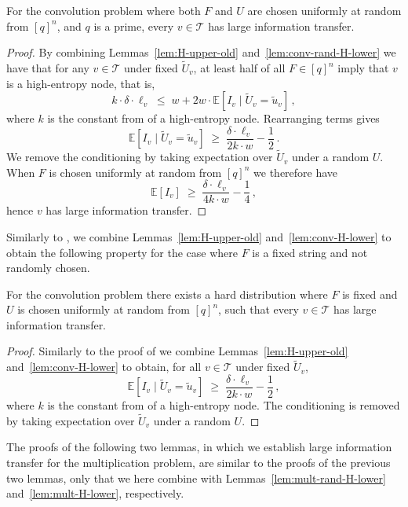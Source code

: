 \documentclass{toc}
\newcommand{\calT}{\ensuremath{\mathcal{T}}}
\newcommand{\expected}[1]{\ensuremath{\mathbb{E}[#1]}}
\newcommand{\lit}{large information transfer\xspace}
\newcommand{\Xvknown}{\ensuremath{\widetilde{U}_v}}
\newcommand{\Xvfix}{\ensuremath{\widetilde{u}_v}}
\newcommand{\vit}{\ensuremath{I_v}}
\begin{document}
\begin{lemma}
	\label{lem:conv-random-it}
	For the convolution problem where both $F$ and $U$ are chosen uniformly at random from $[q]^n$, and $q$ is a prime, every $v\in\calT$ has \lit.
\end{lemma}
\begin{proof}
	By combining Lemmas~\ref{lem:H-upper-old} and~\ref{lem:conv-rand-H-lower} we have that for any $v\in\calT$ under fixed $\Xvknown$, at least half of all $F\in [q]^n$ imply that $v$ is a high-entropy node, that is,
	\[
	k\cdot \delta \cdot\ell_v
	\;\leq\;
	w + 2w\cdot \expected{\vit \mid \Xvknown=\Xvfix}\,,
	\]
	where $k$ is the constant from  of a high-entropy node.
	Rearranging terms gives
	\[
	\expected{\vit \mid \Xvknown=\Xvfix}
	\;\geq\;
	\frac{\delta \cdot\ell_v}{2k\cdot w} - \frac12\,.
	\]
	We remove the conditioning by taking expectation over $\Xvknown$ under a random $U$.
	When $F$ is chosen uniformly at random from $[q]^n$ we therefore have
	\[
	\expected{\vit}
	\;\geq\;
	\frac{\delta \cdot\ell_v}{4k\cdot w} - \frac14\,,
	\]
	hence $v$ has \lit.
\end{proof}

Similarly to , we combine Lemmas~\ref{lem:H-upper-old} and~\ref{lem:conv-H-lower} to obtain the following property for the case where $F$ is a fixed string and not randomly chosen.

\begin{lemma}
	\label{lem:conv-it}
	For the convolution problem there exists a hard distribution where $F$ is fixed and $U$ is chosen uniformly at random from $[q]^n$, such that every $v\in\calT$ has \lit.
\end{lemma}
\begin{proof}
	Similarly to the proof of  we combine Lemmas~\ref{lem:H-upper-old} and~\ref{lem:conv-H-lower} to obtain, for all $v\in\calT$ under fixed $\Xvknown$,
	\[
	\expected{\vit \mid \Xvknown=\Xvfix}
	\;\geq\;
	\frac{\delta \cdot\ell_v}{2k\cdot w} - \frac12\,,
	\]
	where $k$ is the constant from  of a high-entropy node.
	The conditioning is removed by taking expectation over $\Xvknown$ under a random $U$.
\end{proof}

The proofs of the following two lemmas, in which we establish large information transfer for the multiplication problem, are similar to the proofs of the previous two lemmas, only that we here combine  with Lemmas~\ref{lem:mult-rand-H-lower} and~\ref{lem:mult-H-lower}, respectively.
\end{document}
